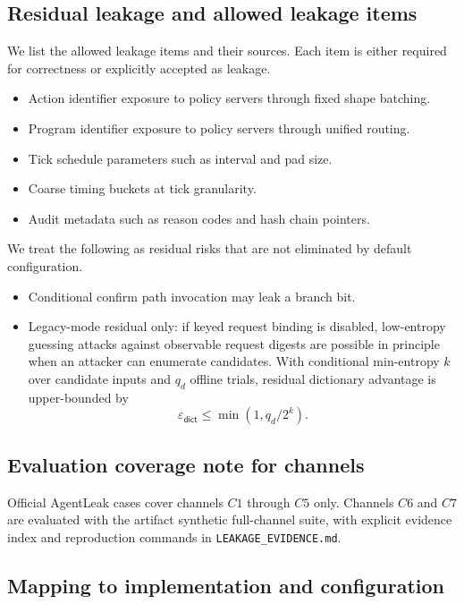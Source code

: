 \subsection{Residual leakage and allowed leakage items}

We list the allowed leakage items and their sources.
Each item is either required for correctness or explicitly accepted as leakage.

\begin{itemize}
\item Action identifier exposure to policy servers through fixed shape batching.
\item Program identifier exposure to policy servers through unified routing.
\item Tick schedule parameters such as interval and pad size.
\item Coarse timing buckets at tick granularity.
\item Audit metadata such as reason codes and hash chain pointers.
\end{itemize}

We treat the following as residual risks that are not eliminated by default configuration.

\begin{itemize}
\item Conditional confirm path invocation may leak a branch bit.
\item Legacy-mode residual only: if keyed request binding is disabled, low-entropy guessing attacks against observable request digests are possible in principle when an attacker can enumerate candidates.
With conditional min-entropy $k$ over candidate inputs and $q_d$ offline trials, residual dictionary advantage is upper-bounded by
\[
\varepsilon_{\mathsf{dict}} \le \min(1,q_d/2^k).
\]
\end{itemize}

\subsection{Evaluation coverage note for channels}

Official AgentLeak cases cover channels $C1$ through $C5$ only.
Channels $C6$ and $C7$ are evaluated with the artifact synthetic full-channel suite, with explicit
evidence index and reproduction commands in \texttt{LEAKAGE\_EVIDENCE.md}.

\subsection{Mapping to implementation and configuration}

